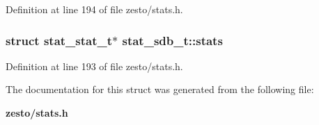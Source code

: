 Definition at line 194 of file zesto/stats.h.
\subsubsection[{stats}]{\setlength{\rightskip}{0pt plus 5cm}struct {\bf stat\_\-stat\_\-t}$\ast$ {\bf stat\_\-sdb\_\-t::stats}\hspace{0.3cm}{\tt  [read]}}\label{structstat__sdb__t_98bbc60c4719f3b34de974d46ed19193}




Definition at line 193 of file zesto/stats.h.

The documentation for this struct was generated from the following file:\begin{CompactItemize}
\item 
{\bf zesto/stats.h}\end{CompactItemize}
